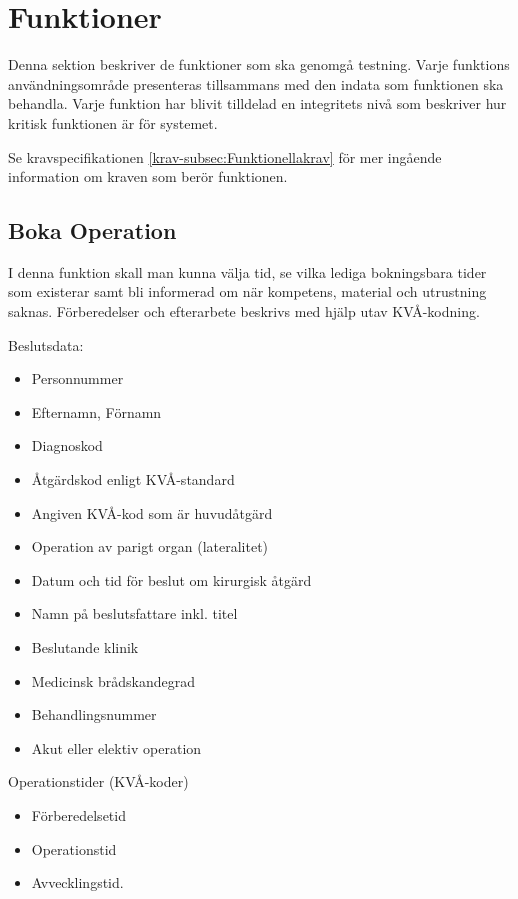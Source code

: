 \documentclass[a4paper,10pt]{article}
\begin{document}
\section{Funktioner}
Denna sektion beskriver de funktioner som ska genomgå testning. Varje funktions användningsområde presenteras tillsammans med den indata som funktionen ska behandla. Varje funktion har blivit tilldelad en integritets nivå som beskriver hur kritisk funktionen är för systemet.

Se kravspecifikationen \ref{krav-subsec:Funktionellakrav} för mer ingående information om kraven som berör funktionen.
    
    \subsection{Boka Operation}

I denna funktion skall man kunna välja tid, se vilka lediga bokningsbara tider som existerar samt bli informerad om när kompetens, material och utrustning saknas. Förberedelser och efterarbete beskrivs med hjälp utav KVÅ-kodning.

Beslutsdata:
\begin{multicols}{3}
\begin{itemize}
	\item Personnummer
	\item Efternamn, Förnamn
	\item Diagnoskod
	\item Åtgärdskod enligt KVÅ-standard
	\item Angiven KVÅ-kod som är huvudåtgärd
	\item Operation av parigt organ (lateralitet)
	\item Datum och tid för beslut om kirurgisk åtgärd
	\item Namn på beslutsfattare inkl. titel
	\item Beslutande klinik
	\item Medicinsk brådskandegrad
	\item Behandlingsnummer
	\item Akut eller elektiv operation
\end{itemize}
\end{multicols}

Operationstider (KVÅ-koder)
\begin{multicols}{3}
\begin{itemize}
	\item Förberedelsetid
	\item Operationstid
	\item Avvecklingstid.
\end{itemize}
\end{multicols}
\end{document}
